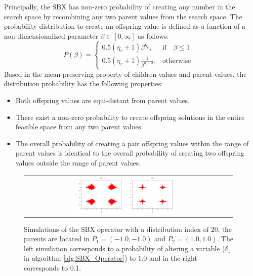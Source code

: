Principally, the SBX has non-zero probability of creating any number in the search space by recombining any two parent values from the search space.
%
The probability distribution to create an offspring value is defined as a function of a non-dimensionalized parameter $\beta \in [0, \infty]$ as follows:
%
\begin{equation}
    P(\beta)= 
\begin{cases}
     0.5(\eta_c + 1)\beta^{\eta_c},& \text{if} \quad \beta \leq 1\\
     0.5(\eta_c + 1) \frac{1}{\beta^{\eta_c + 2}} ,& \text{otherwise}
\end{cases}
\end{equation}
%
Based in the mean-preserving property of children values and parent values, the distribution probability has the following properties:
\begin{itemize}
\item Both offspring values are equi-distant from parent values.
\item There exist a non-zero probability to create offspring solutions in the entire feasible space  from any two parent values.
\item The overall probability of creating a pair offspring values within the range of parent values is identical to the overall probability of creating two offspring values outside  the range of parent values.
\end{itemize}

\begin{figure}[t]
\centering
\begin{tabular}{cc}
   \includegraphics[width=0.25\textwidth]{img/SBX_eta_20_2D_pv_1.png} 
   \includegraphics[width=0.25\textwidth]{img/SBX_eta_20_2D_pv_01.png} 
\end{tabular}
\caption{Simulations of the SBX operator with a distribution index of 20, the parents are located in $P_1=(-1.0, -1.0)$ and $P_2=(1.0, 1.0)$. The left simulation corresponds to a probability of altering a variable ($\delta_1$ in algorithm \ref{alg:SBX_Operator}) to $1.0$ and in the right corresponds to $0.1$.}
\label{fig:Simulation_pv}
\end{figure}





